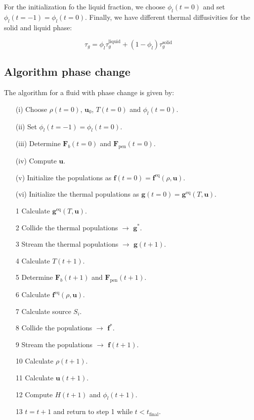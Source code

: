 For the initialization fo the liquid fraction, we choose $\phi_l(t=0)$ and set $\phi_l(t=-1) = \phi_l(t=0)$. Finally, we have different thermal diffusivities for the solid and liquid phase:

\begin{equation}
    \tau_g = \phi_l \tau_g^{\text{liquid}} + \left(1 - \phi_l\right)\tau_g^{\text{solid}}
\end{equation}

\subsection{Algorithm phase change}
The algorithm for a fluid with phase change is given by:

\begin{itemize}\label{it:Algorithm phase change}
    \item[(i)] Choose $\rho(t=0)$, $\bm{u}_0$, $T(t=0)$ and $\phi_l(t=0)$.
    \item[(ii)] Set $\phi_l(t=-1) = \phi_l(t=0)$. 
    \item[(iii)] Determine $\bm{F}_b(t=0)$ and $\bm{F}_{\text{pen}}(t=0)$.
    \item[(iv)] Compute $\bm{u}$. 
    \item[(v)] Initialize the populations as $\bm{f}(t=0) = \bm{f}^{\text{eq}}(\rho, \bm{u})$. 
    \item[(vi)] Initialize the thermal populations as $\bm{g}(t=0) = \bm{g}^{\text{eq}}(T, \bm{u})$. 
    \item[1] Calculate $\bm{g}^{\text{eq}}(T, \bm{u})$. 
    \item[2] Collide the thermal populations $\rightarrow$ $\bm{g}^{\ast}$.
    \item[3] Stream the thermal populations $\rightarrow$ $\bm{g}(t + 1)$.
    \item[4] Calculate $T(t+1)$.
    \item[5] Determine $\bm{F}_b(t+1)$ and $\bm{F}_{\text{pen}}(t+1)$. 
    \item[6] Calculate $\bm{f}^{\text{eq}}(\rho, \bm{u})$.
    \item[7] Calculate source $S_i$.
    \item[8] Collide the populations $\rightarrow$ $\bm{f}^{\ast}$.
    \item[9] Stream the populations $\rightarrow$ $\bm{f}(t + 1)$.
    \item[10] Calculate $\rho(t + 1)$.
    \item[11] Calculate $\bm{u}(t + 1)$.
    \item[12] Compute $H(t+1)$ and $\phi_l(t+1)$. 
    \item[13] $t = t + 1$ and return to step 1 while $t < t_{\text{final}}$.
\end{itemize}